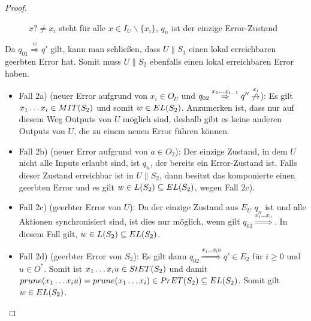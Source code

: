 \begin{proof}
\begin{itemize}
\begin{figure} [h!tbp]
\begin{center}
        \caption{$x?\neq x_i$ steht für alle $x\in I_U\backslash\{x_i\}$, $q_n$
          ist der einzige Error-Zustand}
        \label{UmitE}
      \end{center}
      \end{figure}
      Da $q_{01} \overset{w}{\Rightarrow} q'$ gilt, kann man schließen, dass $U\|S_1$
      einen lokal erreichbaren geerbten Error hat. Somit muss $U\|S_2$ ebenfalls einen
      lokal erreichbaren Error haben.
      \begin{itemize}
        \item Fall 2a) (neuer Error aufgrund von $x_i\in O_U$ und $q_{02}
          \overset{x_1\dots x_{i-1}}{\Rightarrow} q''
          \overset{x_i}{\not{\hspace{-0.1cm}\rightarrow}}$): Es gilt $x_1\dots
          x_i\in MIT{}(S_2)$ und somit $w\in EL{}(S_2)$. Anzumerken ist, dass nur
          auf diesem Weg Outputs von $U$ möglich sind, deshalb gibt es keine
          anderen Outputs von $U$, die zu einem neuen Error führen können.
        \item Fall 2b) (neuer Error aufgrund von $a\in O_2$): Der einzige
          Zustand, in dem $U$ nicht alle Inputs erlaubt sind, ist $q_n$, der
          bereits ein Error-Zustand ist. Falls dieser Zustand erreichbar ist in
          $U\|S_2$, dann besitzt das komponierte \EIO{} einen geerbten Error und
          es gilt $w\in L(S_2)\subseteq EL{}(S_2)$, wegen Fall 2c).
        \item Fall 2c) (geerbter Error von $U$): Da der einzige Zustand aus
          $E_U$ $q_n$ ist und alle Aktionen synchronisiert sind, ist dies nur
          möglich, wenn gilt $q_{02} \overset{x_1\dots x_n}{\Rightarrow}$. In
          diesem Fall gilt, $w\in L(S_2)\subseteq EL{}(S_2)$.
        \item Fall 2d) (geerbter Error von $S_2$): Es gilt dann $q_{02}
          \overset{x_1\dots x_iu}{\Rightarrow} q'\in E_2$ für $i\geq 0$ und
          $u\in O^*$. Somit ist $x_1\dots x_iu\in StET{}(S_2)$ und damit
          $prune{}(x_1\dots x_iu)=prune{}(x_1\dots x_i)\in PrET{}(S_2)\subseteq
          EL{}(S_2)$. Somit gilt $w\in EL{}(S_2)$.
      \end{itemize}
  \end{itemize}
\end{proof}

